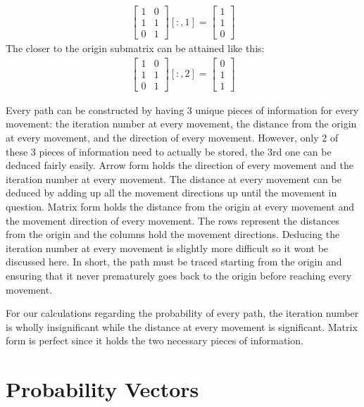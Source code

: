 \documentclass[letterpaper, 12pt]{report}
\begin{document}
\begin{align*}
	\begin{bmatrix}
		1 & 0 \\ 1 & 1 \\ 0 & 1
	\end{bmatrix}
	[:,1] =
	\begin{bmatrix}
		1 \\ 1 \\ 0
	\end{bmatrix}
\end{align*}
The closer to the origin submatrix can be attained like this:
\begin{align*}
	\begin{bmatrix}
		1 & 0 \\ 1 & 1 \\ 0 & 1
	\end{bmatrix}
	[:,2] =
	\begin{bmatrix}
		0 \\ 1 \\ 1
	\end{bmatrix}
\end{align*}

Every path can be constructed by having 3 unique pieces of information for every movement: the iteration number at every movement, the distance from the origin at every movement, and the direction of every movement. However, only 2 of these 3 pieces of information need to actually be stored, the 3rd one can be deduced fairly easily.
Arrow form holds the direction of every movement and the iteration number at every movement. The distance at every movement can be deduced by adding up all the movement directions up until the movement in question. Matrix form holds the distance from the origin at every movement and the movement direction of every movement. The rows represent the distances from the origin and the columns hold the movement directions.
Deducing the iteration number at every movement is slightly more difficult so it wont be discussed here. In short, the path must be traced starting from the origin and ensuring that it never prematurely goes back to the origin before reaching every movement.

For our calculations regarding the probability of every path, the iteration number is wholly insignificant while the distance at every movement is significant. Matrix form is perfect since it holds the two necessary pieces of information.

\section{Probability Vectors}
\end{document}
